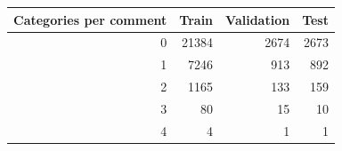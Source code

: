 \begin{tabular}{rrrr}
\toprule
Categories per comment & Train & Validation & Test \\
\midrule
0 & 21384 & 2674 & 2673 \\
1 & 7246 & 913 & 892 \\
2 & 1165 & 133 & 159 \\
3 & 80 & 15 & 10 \\
4 & 4 & 1 & 1 \\
\bottomrule
\end{tabular}
